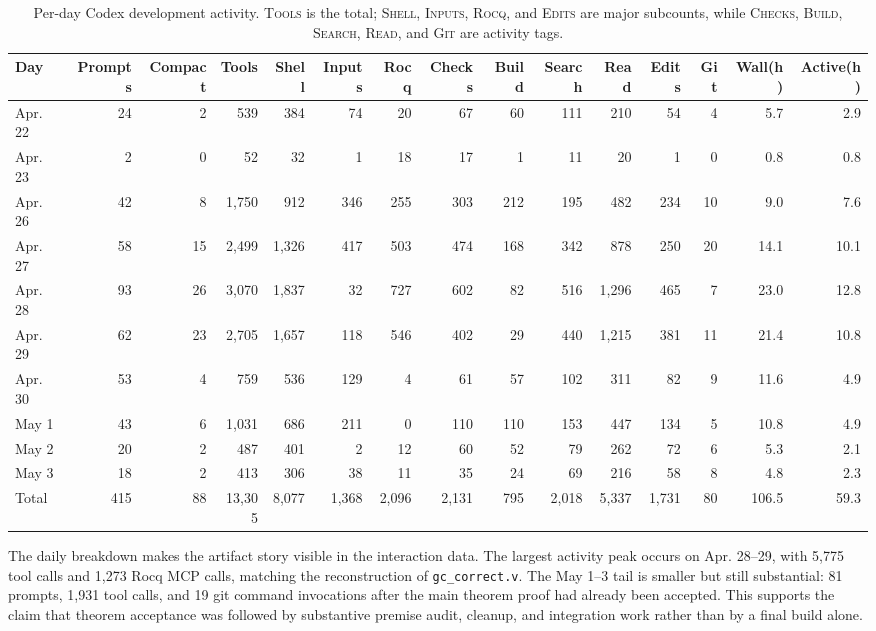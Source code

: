 \documentclass[acmsmall,nonacm]{acmart}
\begin{document}
\begin{table}[htbp]
\centering
\caption{Per-day Codex development activity.  \textsc{Tools} is the total;
\textsc{Shell}, \textsc{Inputs}, \textsc{Rocq}, and \textsc{Edits} are major
subcounts, while \textsc{Checks}, \textsc{Build}, \textsc{Search},
\textsc{Read}, and \textsc{Git} are activity tags.}
\label{tab:per-day-stats}
\footnotesize
\setlength{\tabcolsep}{2pt}
\begin{tabular}{@{}l*{14}{r}@{}}
\toprule
Day & Prompts & Compact & Tools & Shell & Inputs & Rocq & Checks & Build & Search & Read & Edits & Git & Wall(h) & Active(h) \\
\midrule
Apr. 22 & 24 & 2 & 539 & 384 & 74 & 20 & 67 & 60 & 111 & 210 & 54 & 4 & 5.7 & 2.9 \\
Apr. 23 & 2 & 0 & 52 & 32 & 1 & 18 & 17 & 1 & 11 & 20 & 1 & 0 & 0.8 & 0.8 \\
Apr. 26 & 42 & 8 & 1,750 & 912 & 346 & 255 & 303 & 212 & 195 & 482 & 234 & 10 & 9.0 & 7.6 \\
Apr. 27 & 58 & 15 & 2,499 & 1,326 & 417 & 503 & 474 & 168 & 342 & 878 & 250 & 20 & 14.1 & 10.1 \\
Apr. 28 & 93 & 26 & 3,070 & 1,837 & 32 & 727 & 602 & 82 & 516 & 1,296 & 465 & 7 & 23.0 & 12.8 \\
Apr. 29 & 62 & 23 & 2,705 & 1,657 & 118 & 546 & 402 & 29 & 440 & 1,215 & 381 & 11 & 21.4 & 10.8 \\
Apr. 30 & 53 & 4 & 759 & 536 & 129 & 4 & 61 & 57 & 102 & 311 & 82 & 9 & 11.6 & 4.9 \\
May 1 & 43 & 6 & 1,031 & 686 & 211 & 0 & 110 & 110 & 153 & 447 & 134 & 5 & 10.8 & 4.9 \\
May 2 & 20 & 2 & 487 & 401 & 2 & 12 & 60 & 52 & 79 & 262 & 72 & 6 & 5.3 & 2.1 \\
May 3 & 18 & 2 & 413 & 306 & 38 & 11 & 35 & 24 & 69 & 216 & 58 & 8 & 4.8 & 2.3 \\
\midrule
Total & 415 & 88 & 13,305 & 8,077 & 1,368 & 2,096 & 2,131 & 795 & 2,018 & 5,337 & 1,731 & 80 & 106.5 & 59.3 \\
\bottomrule
\end{tabular}
\end{table}

The daily breakdown makes the artifact story visible in the interaction data.
The largest activity peak occurs on Apr. 28--29, with 5,775 tool calls and
1,273 Rocq MCP calls, matching the reconstruction of \texttt{gc\_correct.v}.
The May 1--3 tail is smaller but still substantial: 81 prompts, 1,931 tool
calls, and 19 git command invocations after the main theorem proof had already
been accepted.  This supports the claim that theorem acceptance was followed by
substantive premise audit, cleanup, and integration work rather than by a final
build alone.
\end{document}
